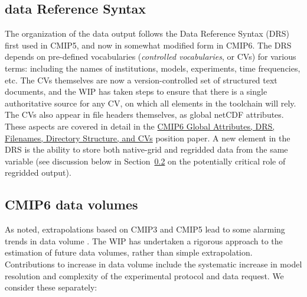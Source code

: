 \documentclass[gmd,manuscript]{copernicus}
\newcommand{\secref}[1] {\mbox{Section  \ref{sec:#1}}}
\begin{document}
\subsection{data Reference Syntax}
\label{sec:data-drs}
The organization of the data output follows the Data Reference
  Syntax (DRS) first used in CMIP5, and now in somewhat modified form
  in CMIP6. The DRS depends on pre-defined vocabularies
  (\emph{controlled vocabularies}, or CVs) for various terms:
  including the names of institutions, models, experiments, time
  frequencies, etc. The CVs themselves are now a version-controlled
  set of structured text documents, and the WIP has taken steps to
  ensure that there is a single authoritative source for any CV, on
  which all elements in the toolchain will rely. The CVs also appear
  in file headers themselves, as global netCDF attributes. These
  aspects are covered in detail in the
  \href{https://goo.gl/cMiPE7}{CMIP6 Global Attributes, DRS,
    Filenames, Directory Structure, and CVs} position paper. A new
  element in the DRS is the ability to store both native-grid and
  regridded data from the same variable (see discussion below in
  \secref{dvol} on the potentially critical role of regridded output).


\subsection{CMIP6 data volumes}
\label{sec:dvol}

As noted, extrapolations based on CMIP3 and CMIP5 lead to some
alarming trends in data volume \citep[see
e.g.,][]{ref:overpecketal2011}. The WIP has undertaken a rigorous
approach to the estimation of future data volumes, rather than simple
extrapolation. Contributions to increase in data volume include the
systematic increase in model resolution and complexity of the
experimental protocol and data request. We consider these separately:
\end{document}
